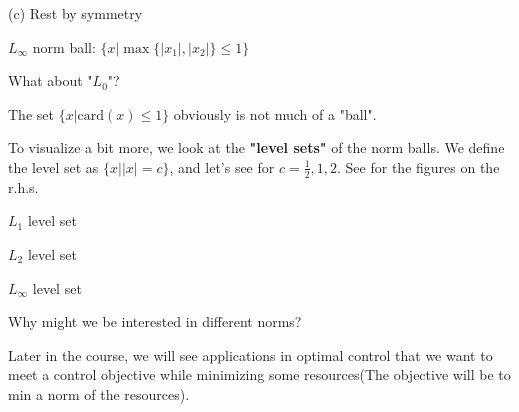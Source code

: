 (c) Rest by symmetry

\newpage
$L_{\infty}$ norm ball: $\{x|\max\{\vert x_{1}\vert, \vert x_{2}\vert\} \leq 1\}$

\begin{figure}
	\centering
	\resizebox{7.5cm}{3cm}{}
	\label{}
\end{figure}

What about "$L_{0}$"? 

\begin{figure}
	\centering
	\resizebox{7.5cm}{3cm}{}
	\label{}
\end{figure}

The set $\{x|\text{card}(x)\leq 1\}$ obviously is not much of a "ball".

\vspace{0.5cm}
To visualize a bit more, we look at the \textbf{"level sets"} of the norm balls. We define the level set as $\{x|\vert x\vert=c \}$, and let's see for $c=\frac{1}{2}, 1, 2$. See for the figures on the r.h.s.

\begin{marginfigure}
	\centering
	\resizebox{7.5cm}{3cm}{}
	\caption{$L_{1}$ level set}
	\label{}
\end{marginfigure}

\begin{marginfigure}
	\centering
	\resizebox{7.5cm}{3cm}{}
	\caption{$L_{2}$ level set}
	\label{}
\end{marginfigure}

\begin{marginfigure}
	\centering
	\resizebox{7.5cm}{3cm}{}
	\caption{$L_{\infty}$ level set}
	\label{}
\end{marginfigure}

\vspace{0.3cm}
Why might we be interested in different norms?

Later in the course, we will see applications in optimal control that we want to meet a control objective while minimizing some resources(The objective will be to min a norm of the resources). %




